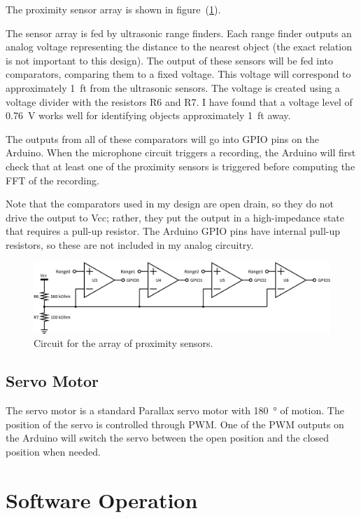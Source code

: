 \documentclass[10pt]{article}           %
\begin{document}
The proximity sensor array is shown in figure~(\ref{fig:rangefinders}).

The sensor array is fed by ultrasonic range finders. Each range finder outputs
an analog voltage representing the distance to the nearest object (the exact
relation is not important to this design). The output of these sensors will be
fed into comparators, comparing them to a fixed voltage. This voltage will
correspond to approximately \SI{1}{ft} from the ultrasonic sensors. The voltage
is created using a voltage divider with the resistors R6 and R7. I have found
that a voltage level of \SI{0.76}{\volt} works well for identifying objects
approximately \SI{1}{ft} away.

The outputs from all of these comparators will go into GPIO pins on the Arduino.
When the microphone circuit triggers a recording, the Arduino will first check
that at least one of the proximity sensors is triggered before computing the
FFT of the recording.

Note that the comparators used in my design are open drain, so they do not drive
the output to Vcc; rather, they put the output in a high-impedance state that
requires a pull-up resistor. The Arduino GPIO pins have internal pull-up
resistors, so these are not included in my analog circuitry.

\begin{figure}[h]
    \centering
    \includegraphics[width=1.0\linewidth]{sch/rangefinders.png}
    \caption{Circuit for the array of proximity sensors.}
\label{fig:rangefinders}
\end{figure}

\subsection{Servo Motor}
\label{sub:servo_motor}

The servo motor is a standard Parallax servo motor with \SI{180}{\degree} of
motion. The position of the servo is controlled through PWM\@. One of the PWM
outputs on the Arduino will switch the servo between the open position and the
closed position when needed.

\section{Software Operation}
\label{sec:source_code_listing}
\end{document}
